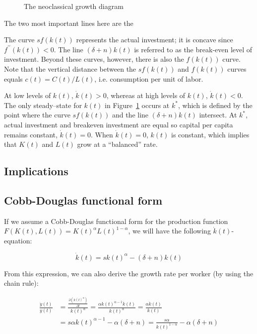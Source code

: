 \documentclass[\topdir/lecture\_notes.tex]{subfiles}
\begin{document}
\begin{figure}[h]
\begin{center}
 \caption{The neoclassical growth diagram}
 \label{fig:solow-neoclassical-growth}
\end{center}
\end{figure}

The two most important lines here are the

The curve \(s f(k(t))\) represents the actual investment; it is concave since \(f^{\prime \prime}(k(t))<0\).
The line \((\delta+n) k(t)\) is referred to as the break-even level of investment.
Beyond these curves, however, there is also the \(f(k(t))\) curve.
Note that the vertical distance between the \(s f(k(t))\) and \(f(k(t))\) curves equals \(c(t)=C(t) / L(t)\), i.e. consumption per unit of labor.

At low levels of \(k(t)\), \(\dot{k}(t)>0\), whereas at high levels of \(k(t)\), \(\dot{k}(t)<0\).
The only steady--state for \(k(t)\) in Figure~\ref{fig:solow-neoclassical-growth} occurs at \(k^{*}\), which is defined by the point where the curve \(s f(k(t))\) and the line \((\delta+n) k(t)\) intersect.
At \(k^{*}\), actual investment and breakeven investment are equal so capital per capita remains constant, \(\dot{k}(t)=0\).
When \(\dot{k}(t)=0\), \(k(t)\) is constant, which implies that \(K(t)\) and \(L(t)\) grow at a ``balanced'' rate.

\subsection{Implications}
\subsection{Cobb-Douglas functional form}
If we assume a Cobb-Douglas functional form for the production function \(F(K(t), L(t)) = K(t)^{\alpha} L(t)^{1-\alpha}\), we will have the following \(\dot{k}(t)\)-equation:

\begin{equation}
  \dot{k}(t)=s k(t)^{\alpha}-(\delta+n) k(t) \label{eq:solow-k-dot-cobb-douglas}
\end{equation}

From this expression, we can also derive the growth rate per worker (by using the chain rule):

\begin{equation}
\begin{aligned}
\frac{\dot{y}(t)}{y(t)} & =\frac{\frac{\partial\left(k(t)^{\alpha}\right)}{\partial t}}{k(t)^{\alpha}}=\frac{\alpha k(t)^{\alpha-1} \dot{k}(t)}{k(t)^{\alpha}}=\frac{\alpha \dot{k}(t)}{k(t)} \\
& =s \alpha k(t)^{\alpha-1}-\alpha(\delta+n)=\frac{s \alpha}{k(t)^{1-\alpha}}-\alpha(\delta+n)
\end{aligned}
\label{eq:solow-growth-rate-per-worker}
\end{equation}
\end{document}
